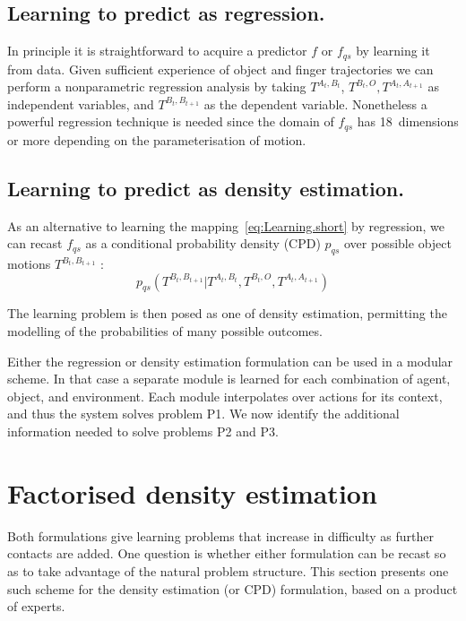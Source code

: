 \subsection{Learning to predict as regression.} In principle it is straightforward to acquire a predictor $f$ or
$f_{qs}$ by learning it from data. Given sufficient experience of
object and finger trajectories we can perform a nonparametric
regression analysis by taking $T^{A_t, B_t}$, $T^{B_t, O}, T^{A_{t},
  A_{t+1}}$ as independent variables, and $T^{B_{t}, B_{t+1}}$
as the dependent variable.  Nonetheless a powerful regression
technique is needed since the domain of $f_{qs}$ has 18~dimensions
or more depending on the parameterisation of motion.

\subsection{Learning to predict as density estimation.} As an alternative to learning the mapping~\eqref{eq:Learning.short} by regression, we can recast $f_{qs}$ as a conditional probability density (CPD) $p_{qs}$ over possible object motions $T^{B_{t},B_{t+1}}$ \citep{kopicki_prediction_2009}:
\begin{equation}
p_{qs}(T^{B_{t}, B_{t+1}} | T^{A_t, B_t}, T^{B_t, O}, T^{A_{t}, A_{t+1}})
\label{eq:Learning.density1}
\end{equation}

The learning problem is then posed as one of density estimation, permitting the modelling of the probabilities of many possible outcomes. 

Either the regression or density estimation formulation can be used in a modular scheme. In that case a separate module is learned for each combination of agent, object, and environment. Each module interpolates over actions for its context, and thus the system solves problem P1. We now identify the additional information needed to solve problems P2 and P3.



\section{Factorised density estimation}
\label{sec:Factors}

Both formulations give learning problems that increase in difficulty as further contacts are added. One question is whether either formulation can be recast so as to take advantage of the natural
problem structure. This section presents one such scheme for the
density estimation (or CPD) formulation, based on a product of experts.

